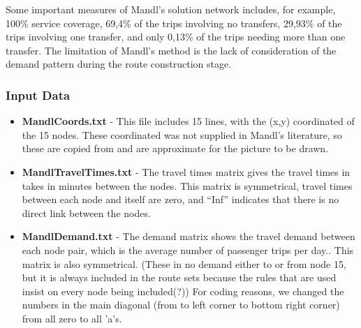 Some important measures of Mandl's solution network includes, for example, 100\% service coverage, 69,4\% of the trips involving no transfers, 29,93\% of the trips involving one transfer, and only 0,13\% of the trips needing more than one transfer. The limitation of Mandl's method is the lack of consideration of the demand pattern during the route construction stage.\citep{zhao03}

\subsubsection {Input Data}
\begin{itemize}
\item \textbf{MandlCoords.txt} - This file includes 15 lines, with the (x,y) coordinated of the 15 nodes. These coordinated was not supplied in Mandl's literature, so these are copied from \citet{fan09} and are approximate for the picture to be drawn.

\begingroup
\obeyspaces\obeylines
%
\endgroup%

\item \textbf{MandlTravelTimes.txt} - The travel times matrix gives the travel times in takes in minutes between the nodes. This matrix is symmetrical, travel times between each node and itself are zero, and ``Inf'' indicates that there is no direct link between the nodes. 

\begingroup
\obeyspaces\obeylines
%
\endgroup%

\item \textbf{MandlDemand.txt} - The demand matrix shows the travel demand between each node pair, which is the average number of passenger trips per day.. This matrix is also symmetrical. (These in no demand either to or from node 15, but it is always included in the route sets because the rules that are used insist on every node being included(?)) For coding reasons, we changed the numbers in the main diagonal (from to left corner to bottom right corner) from all zero to all ’a’s. 

\begingroup
\obeyspaces\obeylines
%
\endgroup%

\end{itemize}

